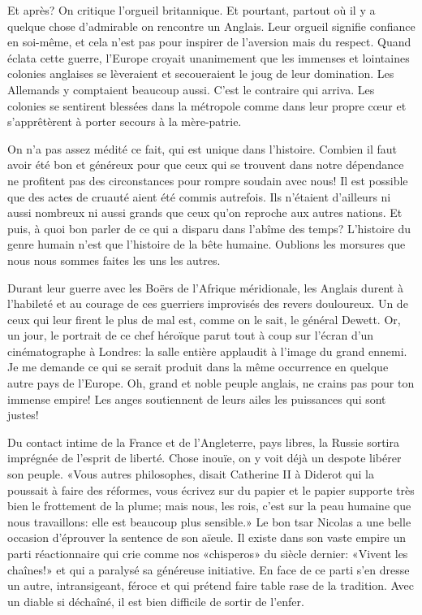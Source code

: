 \begin{chapter}{Et après?}
On critique l'orgueil britannique. Et pourtant, partout où il y a
quelque chose d'admirable on rencontre un Anglais. Leur orgueil signifie
confiance en soi-même, et cela n'est pas pour inspirer de l'aversion
mais du respect. Quand éclata cette guerre, l'Europe croyait unanimement
que les immenses et lointaines colonies anglaises se lèveraient et
secoueraient le joug de leur domination. Les Allemands y comptaient
beaucoup aussi. C'est le contraire qui arriva. Les colonies se sentirent
blessées dans la métropole comme dans leur propre cœur et
s'apprêtèrent à porter secours à la mère-patrie.

On n'a pas assez médité ce fait, qui est unique dans l'histoire. Combien
il faut avoir été bon et généreux pour que ceux qui se trouvent dans
notre dépendance ne profitent pas des circonstances pour rompre soudain
avec nous! Il est possible que des actes de cruauté aient été commis
autrefois. Ils n'étaient d'ailleurs ni aussi nombreux ni aussi grands
que ceux qu'on reproche aux autres nations. Et puis, à quoi bon parler
de ce qui a disparu dans l'abîme des temps? L'histoire du genre humain
n'est que l'histoire de la bête humaine. Oublions les morsures que nous
nous sommes faites les uns les autres.

Durant leur guerre avec les Boërs de l'Afrique méridionale, les Anglais
durent à l'habileté et au courage de ces guerriers improvisés des revers
douloureux. Un de ceux qui leur firent le plus de mal est, comme on le
sait, le général Dewett. Or, un jour, le portrait de ce chef héroïque
parut tout à coup sur l'écran d'un cinématographe à Londres: la salle
entière applaudit à l'image du grand ennemi. Je me demande ce qui se
serait produit dans la même occurrence en quelque autre pays de
l'Europe. Oh, grand et noble peuple anglais, ne crains pas pour ton
immense empire! Les anges soutiennent de leurs ailes les puissances qui
sont justes!

Du contact intime de la France et de l'Angleterre, pays libres, la
Russie sortira imprégnée de l'esprit de liberté. Chose inouïe, on y
voit déjà un despote libérer son peuple. «Vous autres philosophes,
disait Catherine II à Diderot qui la poussait à faire des réformes, vous
écrivez sur du papier et le papier supporte très bien le frottement de
la plume; mais nous, les rois, c'est sur la peau humaine que nous
travaillons: elle est beaucoup plus sensible.» Le bon tsar Nicolas a une
belle occasion d'éprouver la sentence de son aïeule. Il existe dans son
vaste empire un parti réactionnaire qui crie comme nos «chisperos» du
siècle dernier: «Vivent les chaînes!» et qui a paralysé sa généreuse
initiative. En face de ce parti s'en dresse un autre, intransigeant,
féroce et qui prétend faire table rase de la tradition. Avec un diable
si déchaîné, il est bien difficile de sortir de l'enfer.


\end{chapter}
